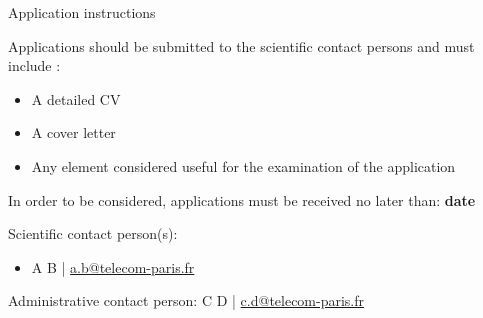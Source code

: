 \begin{graybox}{Application instructions}


Applications should be submitted to the scientific contact persons and must include : 

\begin{itemize}
    \item A detailed CV
\item 	A cover letter
\item Any element considered useful for the examination of the application 

\end{itemize}

In order to be considered, applications must be received no later than: \textbf{date}

Scientific contact person(s)\cite{dummy}:

\begin{itemize}
    \item A B | \url{a.b@telecom-paris.fr}
\end{itemize}

Administrative contact person: C D | \url{c.d@telecom-paris.fr}

\end{graybox}





\vfill
\printbibliography